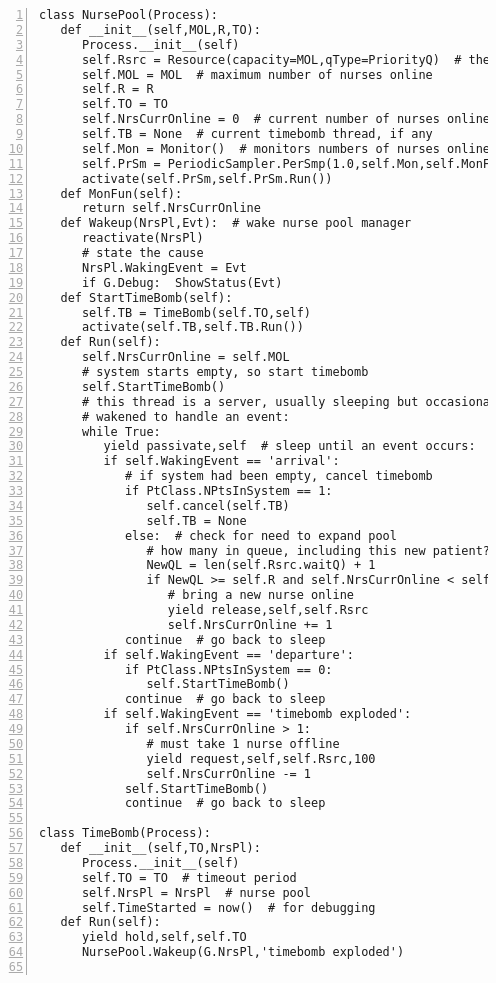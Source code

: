 \documentclass[11pt]{article}
\begin{document}
\begin{Verbatim}[fontsize=\relsize{-2},numbers=left]
class NursePool(Process):
   def __init__(self,MOL,R,TO):
      Process.__init__(self)
      self.Rsrc = Resource(capacity=MOL,qType=PriorityQ)  # the nurses
      self.MOL = MOL  # maximum number of nurses online
      self.R = R
      self.TO = TO
      self.NrsCurrOnline = 0  # current number of nurses online
      self.TB = None  # current timebomb thread, if any
      self.Mon = Monitor()  # monitors numbers of nurses online
      self.PrSm = PeriodicSampler.PerSmp(1.0,self.Mon,self.MonFun)
      activate(self.PrSm,self.PrSm.Run())
   def MonFun(self):
      return self.NrsCurrOnline
   def Wakeup(NrsPl,Evt):  # wake nurse pool manager
      reactivate(NrsPl)
      # state the cause
      NrsPl.WakingEvent = Evt
      if G.Debug:  ShowStatus(Evt)
   def StartTimeBomb(self):
      self.TB = TimeBomb(self.TO,self)
      activate(self.TB,self.TB.Run())
   def Run(self):
      self.NrsCurrOnline = self.MOL
      # system starts empty, so start timebomb
      self.StartTimeBomb()
      # this thread is a server, usually sleeping but occasionally being
      # wakened to handle an event:
      while True:  
         yield passivate,self  # sleep until an event occurs:
         if self.WakingEvent == 'arrival':
            # if system had been empty, cancel timebomb 
            if PtClass.NPtsInSystem == 1:  
               self.cancel(self.TB)
               self.TB = None
            else:  # check for need to expand pool
               # how many in queue, including this new patient?
               NewQL = len(self.Rsrc.waitQ) + 1
               if NewQL >= self.R and self.NrsCurrOnline < self.MOL:
                  # bring a new nurse online
                  yield release,self,self.Rsrc
                  self.NrsCurrOnline += 1
            continue  # go back to sleep
         if self.WakingEvent == 'departure':
            if PtClass.NPtsInSystem == 0:
               self.StartTimeBomb()
            continue  # go back to sleep
         if self.WakingEvent == 'timebomb exploded':
            if self.NrsCurrOnline > 1:  
               # must take 1 nurse offline
               yield request,self,self.Rsrc,100
               self.NrsCurrOnline -= 1
            self.StartTimeBomb()
            continue  # go back to sleep

class TimeBomb(Process):
   def __init__(self,TO,NrsPl):
      Process.__init__(self)
      self.TO = TO  # timeout period
      self.NrsPl = NrsPl  # nurse pool
      self.TimeStarted = now()  # for debugging
   def Run(self):
      yield hold,self,self.TO
      NursePool.Wakeup(G.NrsPl,'timebomb exploded')


\end{Verbatim}
\end{document}
